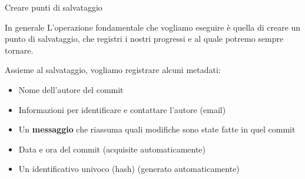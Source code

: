 \documentclass[xcolor=dvipsnames,presentation]{beamer}
\begin{document}
\begin{frame}{Creare punti di salvataggio}
	\begin{block}{In generale}
		L'operazione fondamentale che vogliamo eseguire è quella di creare un punto di salvataggio,
che registri i nostri progressi e al quale potremo sempre tornare.

		Assieme al salvataggio, vogliamo registrare alcuni metadati:
		\begin{itemize}
			\item Nome dell'autore del commit
			\item Informazioni per identificare e contattare l'autore (email)
			\item Un \textbf{messaggio} che riassuma quali modifiche sono state fatte in quel commit
			\item Data e ora del commit (acquisite automaticamente)
			\item Un identificativo univoco (hash) (generato automaticamente)
		\end{itemize}


\end{block}
\end{frame}
\end{document}
